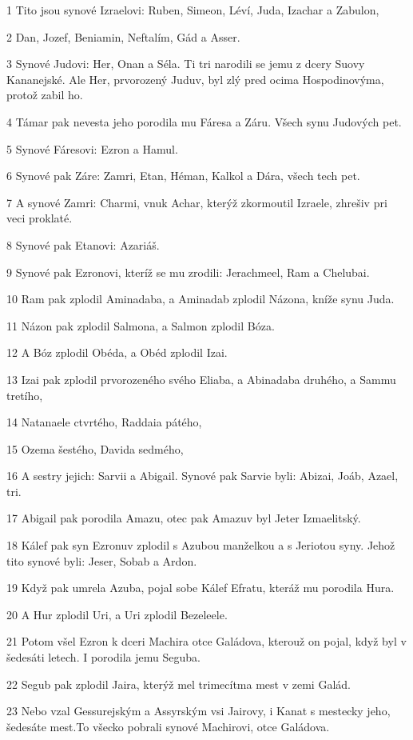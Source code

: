 \par 1 Tito jsou synové Izraelovi: Ruben, Simeon, Léví, Juda, Izachar a Zabulon,
\par 2 Dan, Jozef, Beniamin, Neftalím, Gád a Asser.
\par 3 Synové Judovi: Her, Onan a Séla. Ti tri narodili se jemu z dcery Suovy Kananejské. Ale Her, prvorozený Juduv, byl zlý pred ocima Hospodinovýma, protož zabil ho.
\par 4 Támar pak nevesta jeho porodila mu Fáresa a Záru. Všech synu Judových pet.
\par 5 Synové Fáresovi: Ezron a Hamul.
\par 6 Synové pak Záre: Zamri, Etan, Héman, Kalkol a Dára, všech tech pet.
\par 7 A synové Zamri: Charmi, vnuk Achar, kterýž zkormoutil Izraele, zhrešiv pri veci proklaté.
\par 8 Synové pak Etanovi: Azariáš.
\par 9 Synové pak Ezronovi, kteríž se mu zrodili: Jerachmeel, Ram a Chelubai.
\par 10 Ram pak zplodil Aminadaba, a Aminadab zplodil Názona, kníže synu Juda.
\par 11 Názon pak zplodil Salmona, a Salmon zplodil Bóza.
\par 12 A Bóz zplodil Obéda, a Obéd zplodil Izai.
\par 13 Izai pak zplodil prvorozeného svého Eliaba, a Abinadaba druhého, a Sammu tretího,
\par 14 Natanaele ctvrtého, Raddaia pátého,
\par 15 Ozema šestého, Davida sedmého,
\par 16 A sestry jejich: Sarvii a Abigail. Synové pak Sarvie byli: Abizai, Joáb, Azael, tri.
\par 17 Abigail pak porodila Amazu, otec pak Amazuv byl Jeter Izmaelitský.
\par 18 Kálef pak syn Ezronuv zplodil s Azubou manželkou a s Jeriotou syny. Jehož tito synové byli: Jeser, Sobab a Ardon.
\par 19 Když pak umrela Azuba, pojal sobe Kálef Efratu, kteráž mu porodila Hura.
\par 20 A Hur zplodil Uri, a Uri zplodil Bezeleele.
\par 21 Potom všel Ezron k dceri Machira otce Galádova, kterouž on pojal, když byl v šedesáti letech. I porodila jemu Seguba.
\par 22 Segub pak zplodil Jaira, kterýž mel trimecítma mest v zemi Galád.
\par 23 Nebo vzal Gessurejským a Assyrským vsi Jairovy, i Kanat s mestecky jeho, šedesáte mest.To všecko pobrali synové Machirovi, otce Galádova.
